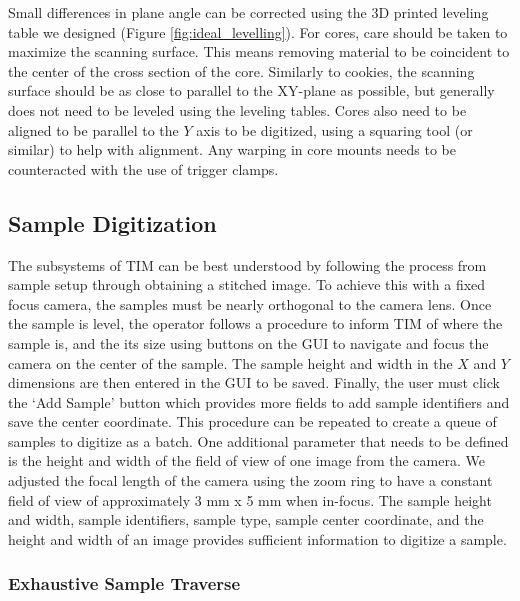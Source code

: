 \documentclass[a4paper,12pt]{article}
\begin{document}
Small differences in plane angle can be corrected using the 3D printed leveling table we designed (Figure \ref{fig:ideal_levelling}). 
For cores, care should be taken to maximize the scanning surface. This means removing material to be coincident to the center of the cross section of the core. 
Similarly to cookies, the scanning surface should be as close to parallel to the XY-plane as possible, but generally does not need to be leveled using the leveling tables.
Cores also need to be aligned to be parallel to the $Y$ axis to be digitized, using a squaring tool (or similar) to help with alignment. Any warping in core mounts needs to be counteracted with the use of trigger clamps. 

\subsection{Sample Digitization} %

The subsystems of TIM can be best understood by following the process from sample setup through obtaining a stitched image. 
To achieve this with a fixed focus camera, the samples must be nearly orthogonal to the camera lens. 
Once the sample is level, the operator follows a procedure to inform TIM of where the sample is, and the its size using buttons on the GUI to navigate and focus the camera on the center of the sample. 
The sample height and width in the $X$ and $Y$ dimensions are then entered in the GUI to be saved. Finally, the user must click the `Add Sample' button which provides more fields to add sample identifiers and save the center coordinate.
This procedure can be repeated to create a queue of samples to digitize as a batch. One additional parameter that needs to be defined is the height and width of the field of view of one image from the camera. 
We adjusted the focal length of the camera using the zoom ring to have a constant field of view of approximately 3 mm x 5 mm when in-focus.  
The sample height and width, sample identifiers, sample type, sample center coordinate, and the height and width of an image provides sufficient information to digitize a sample.

\subsubsection{Exhaustive Sample Traverse}  
\end{document}

